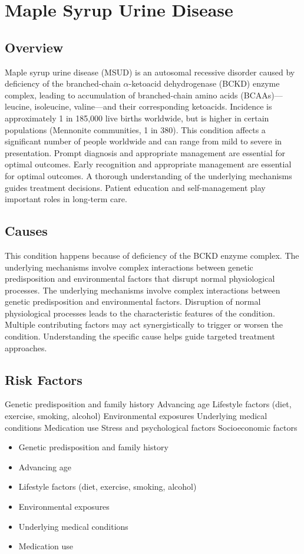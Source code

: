 \chapter{Maple Syrup Urine Disease}
\label{sec:Maple Syrup Urine Disease}

\section{Overview}
Maple syrup urine disease (MSUD) is an autosomal recessive disorder caused by deficiency of the branched-chain $\alpha$-ketoacid dehydrogenase (BCKD) enzyme complex, leading to accumulation of branched-chain amino acids (BCAAs)---leucine, isoleucine, valine---and their corresponding ketoacids. Incidence is approximately 1 in 185,000 live births worldwide, but is higher in certain populations (Mennonite communities, 1 in 380). This condition affects a significant number of people worldwide and can range from mild to severe in presentation. Prompt diagnosis and appropriate management are essential for optimal outcomes. Early recognition and appropriate management are essential for optimal outcomes. A thorough understanding of the underlying mechanisms guides treatment decisions. Patient education and self-management play important roles in long-term care.
\section{Causes}
This condition happens because of deficiency of the BCKD enzyme complex. The underlying mechanisms involve complex interactions between genetic predisposition and environmental factors that disrupt normal physiological processes. The underlying mechanisms involve complex interactions between genetic predisposition and environmental factors. Disruption of normal physiological processes leads to the characteristic features of the condition. Multiple contributing factors may act synergistically to trigger or worsen the condition. Understanding the specific cause helps guide targeted treatment approaches.
\section{Risk Factors}
Genetic predisposition and family history Advancing age Lifestyle factors (diet, exercise, smoking, alcohol) Environmental exposures Underlying medical conditions Medication use Stress and psychological factors Socioeconomic factors

\begin{itemize}[noitemsep]
  \item Genetic predisposition and family history
  \item Advancing age
  \item Lifestyle factors (diet, exercise, smoking, alcohol)
  \item Environmental exposures
  \item Underlying medical conditions
  \item Medication use
\end{itemize}
